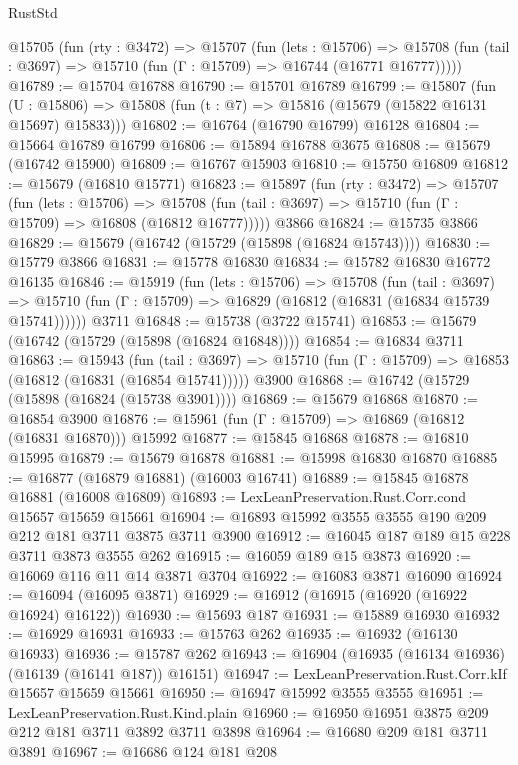 \begin{lexlean}{RustStd}
\begin{coremodule}
  @15705
    (fun (rty : @3472) =>
    @15707
      (fun (lets : @15706) =>
      @15708 (fun (tail : @3697) => @15710 (fun (Γ : @15709) => @16744 (@16771 @16777)))))
@16789 := @15704 @16788
@16790 := @15701 @16789
@16799 := @15807
    (fun (U : @15806) => @15808 (fun (t : @7) => @15816 (@15679 (@15822 @16131 @15697) @15833)))
@16802 := @16764 (@16790 @16799) @16128
@16804 := @15664 @16789 @16799
@16806 := @15894 @16788 @3675
@16808 := @15679 (@16742 @15900)
@16809 := @16767 @15903
@16810 := @15750 @16809
@16812 := @15679 (@16810 @15771)
@16823 := @15897
    (fun (rty : @3472) =>
    @15707
      (fun (lets : @15706) =>
      @15708 (fun (tail : @3697) => @15710 (fun (Γ : @15709) => @16808 (@16812 @16777)))))
    @3866
@16824 := @15735 @3866
@16829 := @15679 (@16742 (@15729 (@15898 (@16824 @15743))))
@16830 := @15779 @3866
@16831 := @15778 @16830
@16834 := @15782 @16830 @16772 @16135
@16846 := @15919
    (fun (lets : @15706) =>
    @15708
      (fun (tail : @3697) =>
      @15710 (fun (Γ : @15709) => @16829 (@16812 (@16831 (@16834 @15739 @15741))))))
    @3711
@16848 := @15738 (@3722 @15741)
@16853 := @15679 (@16742 (@15729 (@15898 (@16824 @16848))))
@16854 := @16834 @3711
@16863 := @15943
    (fun (tail : @3697) => @15710 (fun (Γ : @15709) => @16853 (@16812 (@16831 (@16854 @15741)))))
    @3900
@16868 := @16742 (@15729 (@15898 (@16824 (@15738 @3901))))
@16869 := @15679 @16868
@16870 := @16854 @3900
@16876 := @15961 (fun (Γ : @15709) => @16869 (@16812 (@16831 @16870))) @15992
@16877 := @15845 @16868
@16878 := @16810 @15995
@16879 := @15679 @16878
@16881 := @15998 @16830 @16870
@16885 := @16877 (@16879 @16881) (@16003 @16741)
@16889 := @15845 @16878 @16881 (@16008 @16809)
@16893 := LexLeanPreservation.Rust.Corr.cond @15657 @15659 @15661
@16904 := @16893 @15992 @3555 @3555 @190 @209 @212 @181 @3711 @3875 @3711 @3900
@16912 := @16045 @187 @189 @15 @228 @3711 @3873 @3555 @262
@16915 := @16059 @189 @15 @3873
@16920 := @16069 @116 @11 @14 @3871 @3704
@16922 := @16083 @3871 @16090
@16924 := @16094 (@16095 @3871)
@16929 := @16912 (@16915 (@16920 (@16922 @16924) @16122))
@16930 := @15693 @187
@16931 := @15889 @16930
@16932 := @16929 @16931
@16933 := @15763 @262
@16935 := @16932 (@16130 @16933)
@16936 := @15787 @262
@16943 := @16904 (@16935 (@16134 @16936) (@16139 (@16141 @187)) @16151)
@16947 := LexLeanPreservation.Rust.Corr.kIf @15657 @15659 @15661
@16950 := @16947 @15992 @3555 @3555
@16951 := LexLeanPreservation.Rust.Kind.plain
@16960 := @16950 @16951 @3875 @209 @212 @181 @3711 @3892 @3711 @3898
@16964 := @16680 @209 @181 @3711 @3891
@16967 := @16686 @124 @181 @208

\end{coremodule}
\end{lexlean}

